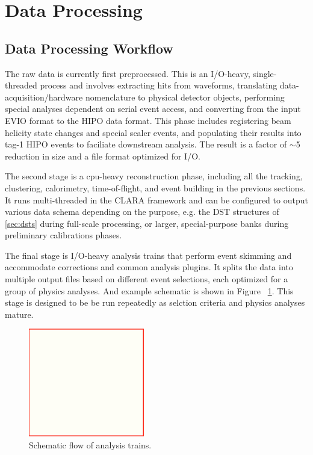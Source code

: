 \section{Data Processing}

\subsection{Data Processing Workflow}
The raw data is currently first preprocessed.  This is an I/O-heavy, single-threaded process and involves extracting hits from waveforms, translating data-acquisition/hardware nomenclature to physical detector objects, performing special analyses dependent on serial event access, and converting from the input EVIO format to the HIPO data format.  This phase includes registering beam helicity state changes and special scaler events, and populating their results into tag-1 HIPO events to faciliate downstream analysis.  The result is a factor of $\sim$5 reduction in size and a file format optimized for I/O.

The second stage is a cpu-heavy reconstruction phase, including all the tracking, clustering, calorimetry, time-of-flight, and event building in the previous sections.  It runs multi-threaded in the CLARA framework and can be configured to output various data schema depending on the purpose, e.g. the DST structures of \ref{sec:dsts} during full-scale processing, or larger, special-purpose banks during preliminary calibrations phases.

The final stage is I/O-heavy analysis trains that perform event skimming and accommodate corrections and common analysis plugins.  It splits the data into multiple output files based on different event selections, each optimized for a group of physics analyses.  And example schematic is shown in Figure ~\ref{fig:train}.  This stage is designed to be be run repeatedly as selction criteria and physics analyses mature.
\begin{figure}
    \includegraphics[width=0.45\textwidth,height=0.2\textheight]{pics/dummy.png}
    \caption{Schematic flow of analysis trains.\label{fig:train}}
\end{figure}


